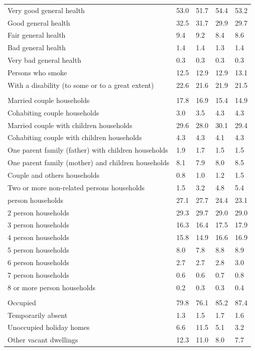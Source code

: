 \documentclass{article}
\begin{document}
\begin{table}[h]
\begin{tabular}{KTTTT}
    \hline
Very good general health & 53.0& 51.7&54.4& 53.2\\
Good general health & 32.5& 31.7& 29.9& 29.7\\
Fair general health & 9.4& 9.2&8.4& 8.6\\
Bad general health & 1.4& 1.4&1.3& 1.4\\
Very bad general health & 0.3& 0.3&0.3& 0.3\\
    \hline
Persons who smoke & 12.5& 12.9&12.9& 13.1\\
    \hline
With a disability (to some or to a great extent) & 22.6& 21.6&21.9& 21.5\\
\hline
    \\ 
    \hline
Married couple households & 17.8& 16.9& 15.4& 14.9\\
Cohabiting couple households & 3.0& 3.5& 4.3& 4.3\\
Married couple with children households & 29.6& 28.0& 30.1& 29.4\\
Cohabiting couple with children households & 4.3& 4.3& 4.1& 4.3\\
One parent family (father) with  children households & 1.9& 1.7& 1.5& 1.5\\
One parent family (mother) and children households & 8.1& 7.9& 8.0& 8.5\\
Couple and others households  & 0.8& 1.0& 1.2& 1.5\\
Two or more non-related persons households & 1.5& 3.2& 4.8& 5.4\\
     person households & 27.1& 27.7& 24.4& 23.1\\
2 person households & 29.3& 29.7& 29.0& 29.0\\
3 person households & 16.3& 16.4& 17.5& 17.9\\
4 person households & 15.8& 14.9& 16.6& 16.9\\
5 person households & 8.0& 7.8& 8.8& 8.9\\
6 person households & 2.7& 2.7& 2.8& 3.0\\
7 person households & 0.6& 0.6& 0.7& 0.8\\
8 or more person households & 0.2& 0.3& 0.3& 0.4\\
\hline
    \\ 
    \hline
Occupied & 79.8& 76.1& 85.2& 87.4\\
Temporarily absent & 1.3& 1.5& 1.7& 1.6\\
Unoccupied holiday homes &  6.6& 11.5&  5.1&  3.2\\
Other vacant dwellings & 12.3& 11.0&  8.0&  7.7\\
\hline
\end{tabular}
\end{table}
\end{document}
